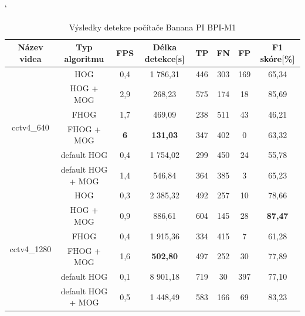 \begin{table}[H]
\catcode`
\centering
\caption{Výsledky detekce počítače Banana PI BPI-M1}
\label{resultTabBPI}
\begin{tabular}{|c|c|c|c|c|c|c|c|}
\hline
{Název videa}        & Typ algoritmu    & FPS & Délka detekce[s]                     & TP  & FN    & FP          & F1 skóre[\%] \\  \hline
\multirow{6}{*}{cctv4\_640}   & HOG     &              0,4        & 1 786,31         & 446 &   303 &    169 &      65,34      \\ \cline{2-8}  
                              & HOG + MOG &            2,9        & 268,23           & 575 &   174 &     18 &      85,69      \\ \cline{2-8}  
                              & FHOG &                 1,7        & 469,09           & 238 &   511 &     43 &      46,21      \\ \cline{2-8}  
                              & FHOG + MOG &           \textbf{6} & \textbf{131,03}           & 347 &   402 &     0  &      63,32      \\ \cline{2-8} 
                              &  default HOG &         0,4        & 1 754,02         & 299 &   450 &     24 &      55,78      \\ \cline{2-8}  
                              &  default HOG + MOG &   1,4        & 546,84           & 364 &   385 &     3  &      65,23      \\ \hline \hline 
\multirow{6}{*}{cctv4\_1280}   & HOG &                  0,3        & 2 385,32         & 492 &   257 &     10 &      78,66      \\ \cline{2-8}  
                              & HOG + MOG &            0,9        & 886,61           & 604 &   145 &     28 &      \textbf{87,47}      \\ \cline{2-8}  
                              & FHOG &                 0,4        & 1 915,36         & 334 &   415 &     7  &      61,28      \\ \cline{2-8}  
                              & FHOG + MOG &           1,6        & \textbf{502,80}  & 497 &   252 &     30 &      77,89      \\ \cline{2-8}  
                              &  default HOG &         0,1        & 8 901,18         & 719 &   30  &     397&      77,10      \\ \cline{2-8}  
                              &  default HOG + MOG &   0,5        & 1 448,49         & 583 &   166 &     69 &      83,23      \\ \hline \hline  

\end{tabular}
\end{table}

